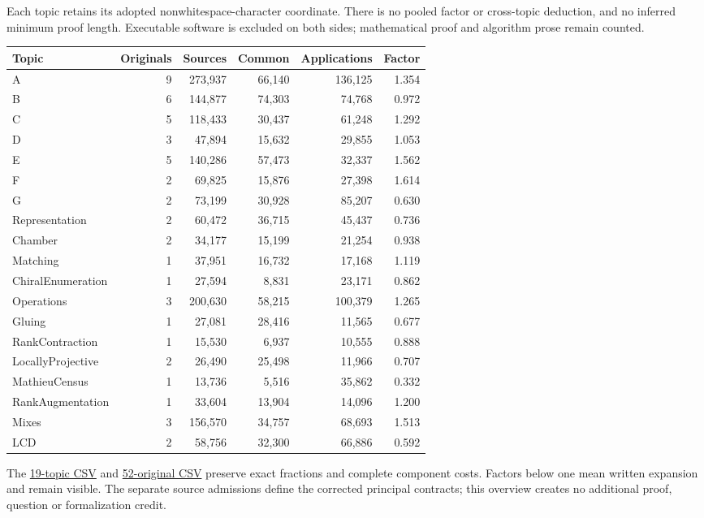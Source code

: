\documentclass[11pt,a4paper]{article}
\begin{document}
Each topic retains its adopted nonwhitespace-character coordinate. There is no pooled factor or cross-topic deduction, and no inferred minimum proof length. Executable software is excluded on both sides; mathematical proof and algorithm prose remain counted.
\begin{center}\small\begin{tabular}{lrrrrr}\toprule
Topic & Originals & Sources & Common & Applications & Factor\\\midrule
A & 9 & 273,937 & 66,140 & 136,125 & 1.354 \\
B & 6 & 144,877 & 74,303 & 74,768 & 0.972 \\
C & 5 & 118,433 & 30,437 & 61,248 & 1.292 \\
D & 3 & 47,894 & 15,632 & 29,855 & 1.053 \\
E & 5 & 140,286 & 57,473 & 32,337 & 1.562 \\
F & 2 & 69,825 & 15,876 & 27,398 & 1.614 \\
G & 2 & 73,199 & 30,928 & 85,207 & 0.630 \\
Representation & 2 & 60,472 & 36,715 & 45,437 & 0.736 \\
Chamber & 2 & 34,177 & 15,199 & 21,254 & 0.938 \\
Matching & 1 & 37,951 & 16,732 & 17,168 & 1.119 \\
ChiralEnumeration & 1 & 27,594 & 8,831 & 23,171 & 0.862 \\
Operations & 3 & 200,630 & 58,215 & 100,379 & 1.265 \\
Gluing & 1 & 27,081 & 28,416 & 11,565 & 0.677 \\
RankContraction & 1 & 15,530 & 6,937 & 10,555 & 0.888 \\
LocallyProjective & 2 & 26,490 & 25,498 & 11,966 & 0.707 \\
MathieuCensus & 1 & 13,736 & 5,516 & 35,862 & 0.332 \\
RankAugmentation & 1 & 33,604 & 13,904 & 14,096 & 1.200 \\
Mixes & 3 & 156,570 & 34,757 & 68,693 & 1.513 \\
LCD & 2 & 58,756 & 32,300 & 66,886 & 0.592 \\
\bottomrule\end{tabular}\end{center}
The \href{topics.csv}{19-topic CSV} and \href{applications.csv}{52-original CSV} preserve exact fractions and complete component costs. Factors below one mean written expansion and remain visible. The separate source admissions define the corrected principal contracts; this overview creates no additional proof, question or formalization credit.
\newpage
\end{document}
